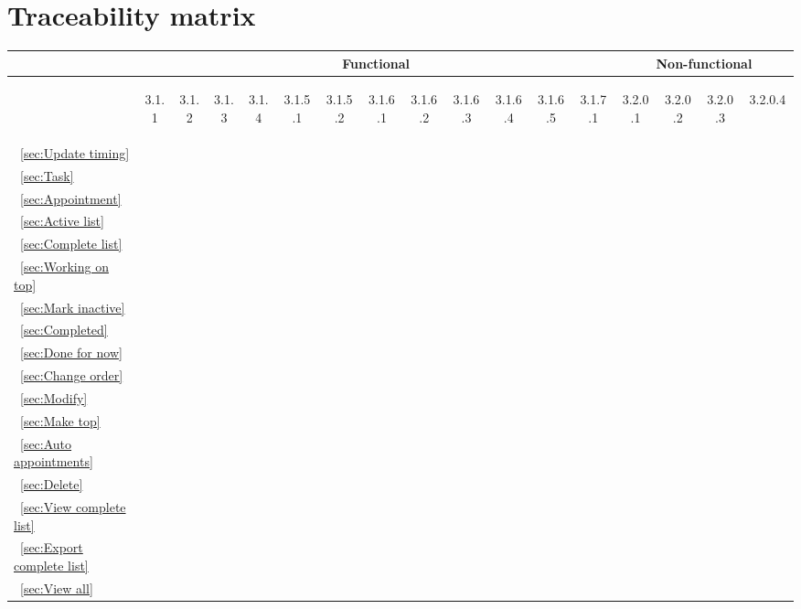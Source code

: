 \documentclass[12pt]{article}
\renewcommand{\c}{\checkmark}
\newcommand{\s}[1] {\begin{sideways}#1\end{sideways}}
\begin{document}
\section{Traceability matrix}
\begin{center}
\begin{tabular}{|l||*{12}{c|}|*{4}{c|}}
\hline
\multicolumn{1}{|c||}{ }&
\multicolumn{12}{|c||}{Functional} &
\multicolumn{4}{|c|}{Non-functional}\\
\hline
	& \s{3.1.1} & \s{3.1.2} & \s{3.1.3} & \s{3.1.4} & \s{3.1.5.1} & \s{3.1.5.2} & \s{3.1.6.1} & \s{3.1.6.2} & \s{3.1.6.3} & \s{3.1.6.4} & \s{3.1.6.5} & \s{3.1.7.1} & \s{3.2.0.1} & \s{3.2.0.2} & \s{3.2.0.3} & \s{3.2.0.4~~}\\
\hline
\hline
~\ref{sec:Update timing}	&	&	&	&	&	&	&	&	&	&	&	&	&\c	&	&	&	\\
\hline
~\ref{sec:Task}				&\c	&	&	&	&	&	&	&	&	&	&	&	&	&	&	&	\\
\hline
~\ref{sec:Appointment}		&	&\c	&	&	&	&	&	&	&	&	&	&	&	&	&	&	\\
\hline
~\ref{sec:Active list}		&	&	&\c	&	&	&	&	&	&	&	&	&	&	&	&	&	\\
\hline
~\ref{sec:Complete list}	&	&	&	&\c	&	&	&	&	&	&	&	&	&	&\c	&	&	\\
\hline
~\ref{sec:Working on top}	&	&	&	&	&	&	&\c	&	&	&	&	&	&	&	&	&	\\
\hline
~\ref{sec:Mark inactive}	&	&	&	&	&	&	&	&\c	&	&	&	&	&	&	&	&	\\
\hline
~\ref{sec:Completed}		&	&	&	&	&	&	&	&	&\c	&	&	&	&	&	&	&	\\
\hline
~\ref{sec:Done for now}		&	&	&	&	&	&	&	&	&	&\c	&	&	&	&	&	&	\\
\hline
~\ref{sec:Change order}		&	&	&	&	&	&\c	&	&	&	&	&\c	&	&	&	&	&	\\
\hline
~\ref{sec:Modify}			&	&	&	&	&\c	&	&	&	&	&	&	&	&	&	&	&	\\
\hline
~\ref{sec:Make top}			&	&	&	&	&	&\c	&	&	&	&	&	&	&	&	&	&	\\
\hline
~\ref{sec:Auto appointments}&	&	&	&	&	&	&	&	&	&	&	&\c	&\c	&	&	&	\\
\hline
~\ref{sec:Delete}			&	&	&	&	&	&	&	&	&	&	&	&	&	&	&	&\c	\\
\hline
~\ref{sec:View complete list}
							&	&	&	&	&	&	&	&	&	&	&	&	&	&	&\c	&	\\
\hline
~\ref{sec:Export complete list}
							&	&	&	&	&	&	&	&	&	&	&	&	&	&	&\c	&	\\
\hline
~\ref{sec:View all}			&	&	&	&	&	&	&	&	&	&	&	&	&	&	&\c	&	\\
\hline
\end{tabular}
\end{center}
\end{document}
